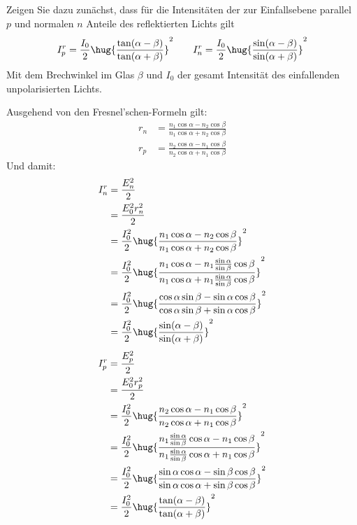 \documentclass[ex]{exercise}
\begin{document}
\subsection{}
Zeigen Sie dazu zunächst, dass für die Intensitäten der zur Einfallsebene parallel \(p\)
und normalen \(n\) Anteile des reflektierten Lichts gilt
\begin{align*}
    I_p^r = \frac{I_0}{2} \hug{\frac{\tan(\alpha-\beta)}{\tan(\alpha+\beta)}}^2
    \qquad I_n^r = \frac{I_0}{2} \hug{\frac{\sin(\alpha-\beta)}{\sin(\alpha+\beta)}}^2
\end{align*}
Mit dem Brechwinkel im Glas \(\beta\) und \(I_0\) der gesamt Intensität des einfallenden 
unpolarisierten Lichts.

\dottedlinett

Ausgehend von den Fresnel'schen-Formeln gilt:
\begin{align*}
    r_n &= \frac{n_1\cos\alpha - n_2\cos\beta}{n_1\cos\alpha + n_2\cos\beta}\\
    r_p &= \frac{n_2\cos\alpha - n_1\cos\beta}{n_2\cos\alpha + n_1\cos\beta}
\end{align*}
Und damit:
\begin{align*}
    I_n^r &= \frac{E_n^2}{2} \\
    &= \frac{E_0^2 r_n^2}{2} \\
    &= \frac{I_0^2}{2} \hug{\frac{n_1\cos\alpha - n_2\cos\beta}{n_1\cos\alpha + n_2\cos\beta}}^2\\
    &= \frac{I_0^2}{2} \hug{\frac{n_1\cos\alpha - n_1 \frac{\sin \alpha}{\sin\beta}
    \cos\beta}{n_1\cos\alpha + n_1 \frac{\sin \alpha}{\sin\beta}\cos\beta}}^2\\
    &= \frac{I_0^2}{2} \hug{\frac{\cos\alpha\sin\beta - \sin\alpha\cos\beta}
    {\cos\alpha\sin\beta + \sin\alpha\cos\beta}}^2\\
    &= \frac{I_0^2}{2} \hug{\frac{\sin(\alpha-\beta)}{\sin(\alpha+\beta)}}^2\\
\end{align*}
\begin{align*}
    I_p^r &= \frac{E_p^2}{2} \\
    &= \frac{E_0^2 r_p^2}{2} \\
    &= \frac{I_0^2}{2} \hug{\frac{n_2\cos\alpha - n_1\cos\beta}{n_2\cos\alpha + n_1\cos\beta}}^2\\
    &= \frac{I_0^2}{2} \hug{\frac{n_1 \frac{\sin \alpha}{\sin\beta}\cos\alpha - n_1\cos\beta}{n_1 \frac{\sin \alpha}{\sin\beta}\cos\alpha + n_1\cos\beta}}^2\\
    &= \frac{I_0^2}{2} \hug{\frac{\sin \alpha\cos\alpha - \sin\beta \cos\beta}
    {\sin \alpha\cos\alpha +\sin\beta \cos\beta}}^2\\
    &= \frac{I_0^2}{2} \hug{\frac{\tan(\alpha-\beta)}{\tan(\alpha+\beta)}}^2\\
\end{align*}
\end{document}
